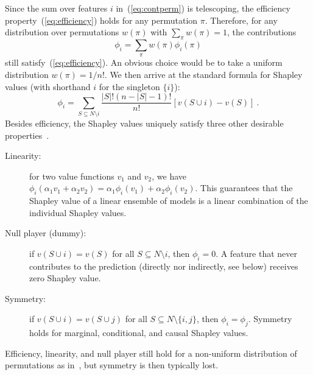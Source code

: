 \documentclass{article}
\newcommand{\vX}{\mathbf{X}}
\newcommand{\vx}{\mathbf{x}}
\newcommand{\expectation}{\mathbb{E}}
\newcommand{\contribution}{{\phi}}
\newcommand{\val}{{v}}
\newcommand{\perm}{\pi}
\newcommand{\operator}{\mathit{op}}
\newcommand{\svop}[1]{\operator(\vx_{#1})}
\newcommand{\allfeatures}{{N}}
\begin{document}
Since the sum over features $i$ in~(\ref{eq:contperm}) is telescoping, the efficiency property~(\ref{eq:efficiency}) holds for any permutation $\perm$.
Therefore, for any distribution over permutations $w(\perm)$ with $\sum_{\perm} w(\perm) = 1$, the contributions
\begin{equation}
\contribution_i = \sum_{\perm} w(\perm) \contribution_i(\perm)
\label{eq:shapperm}
\end{equation}
still satisfy~(\ref{eq:efficiency}). An obvious choice would be to take a uniform distribution $w(\perm) = 1/n!$. We then arrive at the standard formula for Shapley values (with shorthand $i$ for the singleton $\{i\}$):
\[
\contribution_i = \sum_{S \subseteq \allfeatures\setminus i} \frac{|S|! (n-|S|-1)!}{n!} \left[\val(S \cup i) - \val(S) \right] \: .
\]
Besides efficiency, the Shapley values uniquely satisfy three other desirable properties~\cite{shapley1953value}.
\begin{description}
	\item[Linearity:] for two value functions $\val_1$ and $\val_2$, we have $\contribution_i(\alpha_1 \val_1 + \alpha_2 \val_2) = \alpha_1 \contribution_i(\val_1) + \alpha_2 \contribution_i(\val_2)$. This guarantees that the Shapley value of a linear ensemble of models is a linear combination of the individual Shapley values.
	\item[Null player (dummy):] if $\val(S \cup i) = \val(S)$ for all $S \subseteq \allfeatures \setminus i$, then $\contribution_i = 0$. A feature that never contributes to the prediction (directly nor indirectly, see below) receives zero Shapley value.
	\item[Symmetry:] if $\val(S \cup i) = \val(S \cup j)$ for all  $S \subseteq \allfeatures \setminus \{i,j\}$, then $\contribution_i = \contribution_j$. Symmetry holds for marginal, conditional, and causal Shapley values.
\end{description}
Efficiency, linearity, and null player still hold for a non-uniform distribution of permutations as in~\cite{frye2019asymmetric}, but symmetry is then typically lost.
\end{document}
